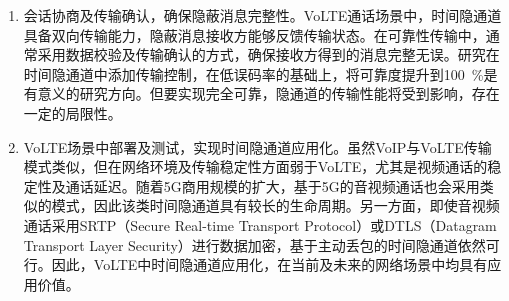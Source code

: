 \begin{conclusion}
\begin{enumerate}
    \item
    会话协商及传输确认，确保隐蔽消息完整性。VoLTE通话场景中，时间隐通道具备双向传输能力，隐蔽消息接收方能够反馈传输状态。在可靠性传输中，通常采用数据校验及传输确认的方式，确保接收方得到的消息完整无误。研究在时间隐通道中添加传输控制，在低误码率的基础上，将可靠度提升到{100\ \%}是有意义的研究方向。但要实现完全可靠，隐通道的传输性能将受到影响，存在一定的局限性。
    
    \item
    VoLTE场景中部署及测试，实现时间隐通道应用化。虽然VoIP与VoLTE传输模式类似，但在网络环境及传输稳定性方面弱于VoLTE，尤其是视频通话的稳定性及通话延迟。随着5G商用规模的扩大，基于5G的音视频通话也会采用类似的模式，因此该类时间隐通道具有较长的生命周期。另一方面，即使音视频通话采用SRTP（Secure Real-time Transport Protocol）或DTLS（Datagram Transport Layer Security）进行数据加密，基于主动丢包的时间隐通道依然可行。因此，VoLTE中时间隐通道应用化，在当前及未来的网络场景中均具有应用价值。

\end{enumerate}

\end{conclusion}
